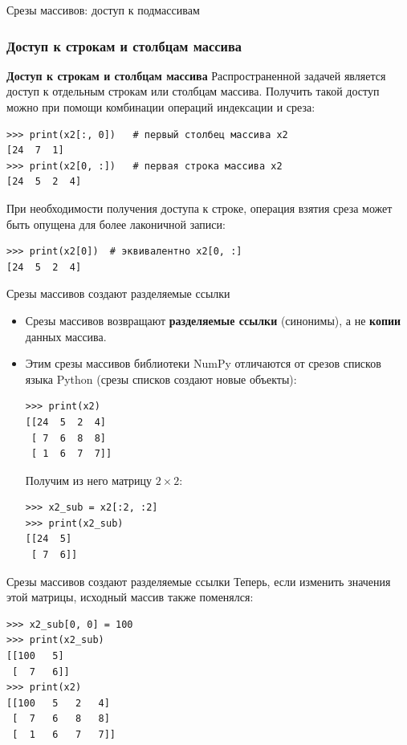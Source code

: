 \documentclass[aspectratio=169, mathserif]{beamer}%
\begin{document}
\begin{frame}[fragile]{Срезы массивов: доступ к подмассивам}
\scriptsize
\subsubsection{Доступ к строкам и столбцам массива}
\begin{alertblock}{\textbf{Доступ к строкам и столбцам массива}}
Распространенной задачей является доступ к отдельным строкам или столбцам массива.
Получить такой доступ можно при помощи комбинации операций индексации и среза:
\begin{verbatim}
>>> print(x2[:, 0])   # первый столбец массива x2
[24  7  1]
>>> print(x2[0, :])   # первая строка массива x2
[24  5  2  4]
\end{verbatim}
При необходимости получения доступа к строке, операция взятия среза может быть опущена для более лаконичной записи:
\begin{verbatim}
>>> print(x2[0])  # эквивалентно x2[0, :]
[24  5  2  4]
\end{verbatim}
\end{alertblock}
\vfill
\end{frame}

\begin{frame}[fragile]{Срезы массивов создают разделяемые ссылки}
\scriptsize
\begin{itemize}
\item Срезы массивов возвращают \textcolor{extraorange}{\textbf{разделяемые ссылки}} (синонимы), а не \textcolor{extraorange}{\textbf{копии}} данных массива.
\item Этим срезы массивов библиотеки NumPy отличаются от срезов списков языка Python (срезы списков создают новые объекты):
\begin{verbatim}
>>> print(x2)
[[24  5  2  4]
 [ 7  6  8  8]
 [ 1  6  7  7]]
\end{verbatim}

Получим из него матрицу $2 \times 2$:

\begin{verbatim}
>>> x2_sub = x2[:2, :2]
>>> print(x2_sub)
[[24  5]
 [ 7  6]]
\end{verbatim}
\end{itemize}
\vfill
\end{frame}

\begin{frame}[fragile]{Срезы массивов создают разделяемые ссылки}
\scriptsize
Теперь, если изменить значения этой матрицы, исходный массив также поменялся:

\begin{verbatim}
>>> x2_sub[0, 0] = 100
>>> print(x2_sub)
[[100   5]
 [  7   6]]
>>> print(x2)
[[100   5   2   4]
 [  7   6   8   8]
 [  1   6   7   7]]
\end{verbatim}
\vfill
\end{frame}
\end{document}
